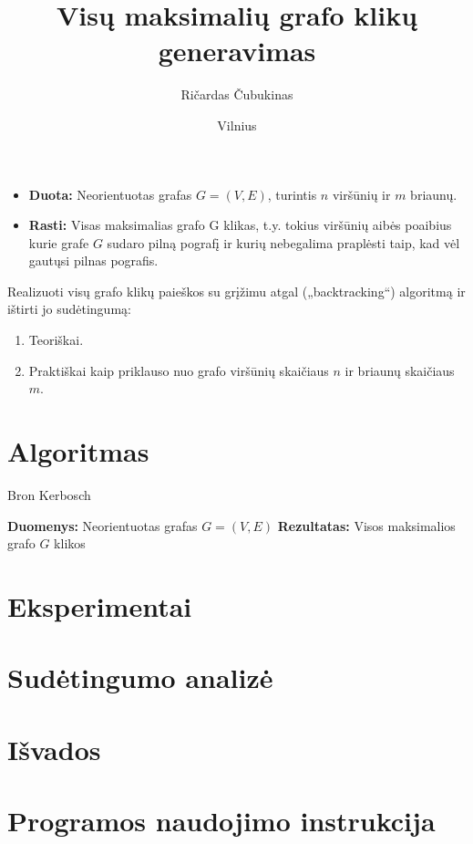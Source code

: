 \documentclass{VUMIFInfKursinis}
\institute{Informatikos institutas}
\title{Visų maksimalių grafo klikų generavimas}
\author{Ričardas Čubukinas}
\date{Vilnius \\ \the\year}
\begin{document}
\maketitle

\tableofcontents

\begin{itemize}
  \item{\textbf{Duota:} Neorientuotas grafas $G=(V,E)$, turintis $n$ viršūnių ir $m$ briaunų.}
  \item{\textbf{Rasti:} Visas maksimalias grafo G klikas, t.y. tokius viršūnių aibės poaibius kurie grafe $G$ sudaro pilną pografį ir kurių nebegalima praplėsti taip, kad vėl gautųsi pilnas pografis.}
\end{itemize}

Realizuoti visų grafo klikų paieškos su grįžimu atgal („backtracking“) algoritmą ir ištirti jo
sudėtingumą:
\begin{enumerate}
  \item{Teoriškai.}
  \item{Praktiškai kaip priklauso nuo grafo viršūnių skaičiaus $n$ ir briaunų skaičiaus $m$.}
\end{enumerate}

\section{Algoritmas}
\begin{algorithm}[H]
  \DontPrintSemicolon
  \caption{Bron Kerbosch}
  \textbf{Duomenys:} Neorientuotas grafas $G=(V,E)$ \;
  \textbf{Rezultatas:} Visos maksimalios grafo $G$ klikos \;
\end{algorithm}

\section{Eksperimentai}

\section{Sudėtingumo analizė}

\section{Išvados}

\section{Programos naudojimo instrukcija}

\printbibliography[heading=bibintoc] %

\end{document}
